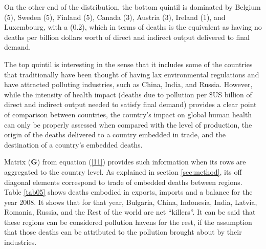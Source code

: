 \documentclass[a4paper,12pt, ]{article}
\begin{document}
On the other end of the distribution, the bottom quintil is dominated by Belgium (5), Sweden (5), Finland (5), Canada (3), Austria (3), Ireland (1), and Luxembourg, with a (0.2), which in terms of deaths is the equivalent as having no deaths per billion dollars worth of direct and indirect output delivered to final demand.

The top quintil is interesting in the sense that it includes some of the countries that traditionally have been thought of having lax environmental regulations and have attracted polluting industries, such as China, India, and Russia. However, while the intensity of health impact (deaths due to pollution per \$US billion of direct and indirect output needed to satisfy final demand) provides a clear point of comparison between countries, the country's impact on global human health can only be properly assessed when compared with the level of production, the origin of the deaths delivered to a country embedded in trade, and the destination of a country's embedded deaths.

Matrix ($\mathbf{G}$) from equation (\ref{11}) provides such information when its rows are aggregated to the country level. As explained in section \ref{sec:method}, its off diagonal elements correspond to trade of embedded deaths between regions. Table \ref{tab05} shows deaths embodied in exports, imports and a balance for the year 2008. It shows that for that year, Bulgaria, China, Indonesia, India, Latvia, Romania, Russia, and the Rest of the world are net ``killers''. It can be said that these regions can be considered pollution havens for the rest, if the assumption that those deaths can be attributed to the pollution brought about by their industries.
\end{document}
